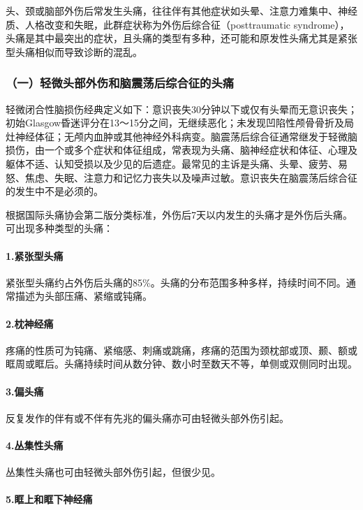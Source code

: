 头、颈或脑部外伤后常发生头痛，往往伴有其他症状如头晕、注意力难集中、神经质、人格改变和失眠，此群症状称为外伤后综合征（posttraumatic
syndrome），头痛是其中最突出的症状，且头痛的类型有多种，还可能和原发性头痛尤其是紧张型头痛相似而导致诊断的混乱。

\subsubsection{（一）轻微头部外伤和脑震荡后综合征的头痛}

轻微闭合性脑损伤经典定义如下：意识丧失30分钟以下或仅有头晕而无意识丧失；初始Glasgow昏迷评分在13～15分之间，无继续恶化；未发现凹陷性颅骨骨折及局灶神经体征；无颅内血肿或其他神经外科病变。脑震荡后综合征通常继发于轻微脑损伤，由一个或多个症状和体征组成，常表现为头痛、脑神经症状和体征、心理及躯体不适、认知受损以及少见的后遗症。最常见的主诉是头痛、头晕、疲劳、易怒、焦虑、失眠、注意力和记忆力丧失以及噪声过敏。意识丧失在脑震荡后综合征的发生中不是必须的。

根据国际头痛协会第二版分类标准，外伤后7天以内发生的头痛才是外伤后头痛。可出现多种类型的头痛：

\paragraph{1.紧张型头痛}

紧张型头痛约占外伤后头痛的85\%。头痛的分布范围多种多样，持续时间不同。通常描述为头部压痛、紧缩或钝痛。

\paragraph{2.枕神经痛}

疼痛的性质可为钝痛、紧缩感、刺痛或跳痛，疼痛的范围为颈枕部或顶、颞、额或眶周或眶后。头痛持续时间从数分钟、数小时至数天不等，单侧或双侧同时出现。

\paragraph{3.偏头痛}

反复发作的伴有或不伴有先兆的偏头痛亦可由轻微头部外伤引起。

\paragraph{4.丛集性头痛}

丛集性头痛也可由轻微头部外伤引起，但很少见。

\paragraph{5.眶上和眶下神经痛}

